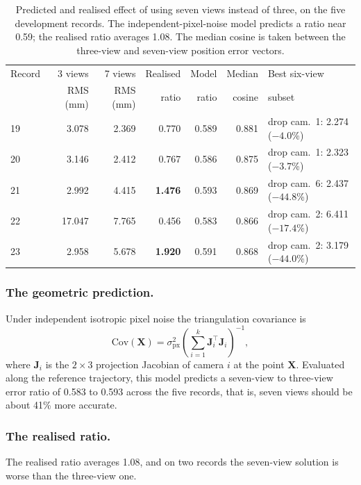\documentclass{iopjournal}
\begin{document}
\begin{table}
\caption{Predicted and realised effect of using seven views instead of three,
on the five development records. The independent-pixel-noise model predicts a
ratio near 0.59; the realised ratio averages 1.08. The median cosine is taken
between the three-view and seven-view position error vectors.}
\centering
\begin{tabular}{lrrrrrl}
\hline
Record & 3 views & 7 views & Realised & Model & Median & Best six-view\\
 & RMS (mm) & RMS (mm) & ratio & ratio & cosine & subset\\
\hline
19 & 3.078 & 2.369 & 0.770 & 0.589 & 0.881 & drop cam.\ 1: 2.274 ($-4.0$\%)\\
20 & 3.146 & 2.412 & 0.767 & 0.586 & 0.875 & drop cam.\ 1: 2.323 ($-3.7$\%)\\
21 & 2.992 & 4.415 & \textbf{1.476} & 0.593 & 0.869 & drop cam.\ 6: 2.437 ($-44.8$\%)\\
22 & 17.047 & 7.765 & 0.456 & 0.583 & 0.866 & drop cam.\ 2: 6.411 ($-17.4$\%)\\
23 & 2.958 & 5.678 & \textbf{1.920} & 0.591 & 0.868 & drop cam.\ 2: 3.179 ($-44.0$\%)\\
\hline
\end{tabular}
\label{tab:mechanism}
\end{table}

\subsubsection{The geometric prediction.}
Under independent isotropic pixel noise the triangulation covariance is
\begin{equation}
\mathrm{Cov}(\mathbf{X}) = \sigma_{\mathrm{px}}^{2}
\left( \sum_{i=1}^{k} \mathbf{J}_{i}^{\top}\mathbf{J}_{i} \right)^{-1},
\label{eq:cov}
\end{equation}
where $\mathbf{J}_{i}$ is the $2\times3$ projection Jacobian of camera $i$ at
the point $\mathbf{X}$. Evaluated along the reference trajectory, this model
predicts a seven-view to three-view error ratio of 0.583 to 0.593 across the
five records, that is, seven views should be about 41\% more accurate.

\subsubsection{The realised ratio.}
The realised ratio averages 1.08, and on two records the seven-view solution
is worse than the three-view one.
\end{document}

